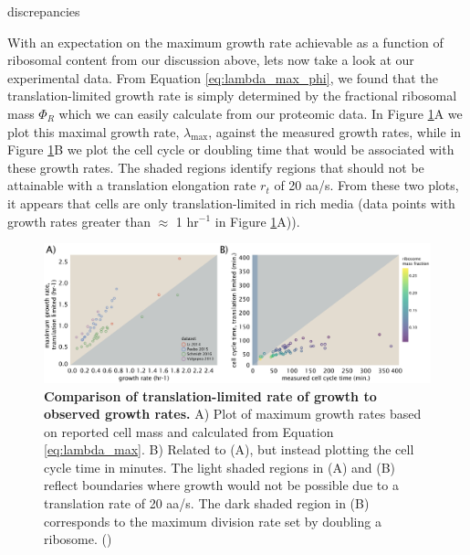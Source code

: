discrepancies \documentclass[11pt, letterpaper]{article}
\begin{document}
With an expectation on the maximum growth rate achievable as a function of
ribosomal content from our discussion above, lets now take a look at our experimental
data. From Equation \ref{eq:lambda_max_phi}, we found that the
translation-limited growth  rate is simply determined by the fractional
ribosomal mass $\Phi_R$ which we can easily calculate from our proteomic data.   In Figure
\ref{fig:estimates_translation_data}A we plot this maximal growth rate,
$\lambda_{\text{max}}$, against the measured growth rates, while in Figure
\ref{fig:estimates_translation_data}B we plot the cell cycle or doubling time that would be
associated with these growth rates. The shaded regions identify regions that
should not be attainable with a translation elongation rate $r_t$ of 20 aa/s.
From these two plots, it appears that cells are only translation-limited in rich
media (data points with growth rates greater than $\approx$ 1 hr$^{-1}$ in Figure
\ref{fig:estimates_translation_data}A)).



\begin{figure}[H]
		\centering
    \includegraphics[width=1\textwidth]{../../code/figures/SI/estimates_translation_data.pdf}
  \caption{{\bf Comparison of translation-limited rate of growth to observed growth rates.}
	A) Plot of maximum growth rates based on reported cell mass and calculated from Equation \ref{eq:lambda_max}.
	B) Related to (A), but instead plotting the cell cycle time in minutes.
	The light shaded regions in (A) and (B) reflect boundaries where growth would not be possible
	due to a translation rate of 20 aa/s. The dark shaded region in (B) corresponds to the maximum
	division rate set by doubling a ribosome.
	()}
  \label{fig:estimates_translation_data}
\end{figure}
\end{document}
